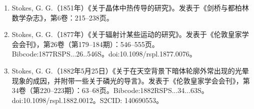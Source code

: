 \begin{enumerate}
\item Stokes, G. G.（1851年）《关于晶体中热传导的研究》。发表于《剑桥与都柏林数学杂志》，第6卷：215–238页。
\item Stokes, G. G.（1877年）《关于辐射计某些运动的研究》。发表于《伦敦皇家学会会刊》，第26卷（第179–184期）：546–555页。Bibcode:1877RSPS...26..546S。doi:10.1098/rspl.1877.0076。
\item Stokes, G. G.（1882年5月25日）《关于在天空背景下暗体轮廓外常出现的光晕现象的成因，并附带一些关于磷光的导言》。发表于《伦敦皇家学会会刊》，第34卷（第220–223期）：63–68页。Bibcode:1882RSPS...34...63S。doi:10.1098/rspl.1882.0012。S2CID: 140690553。

\end{enumerate}